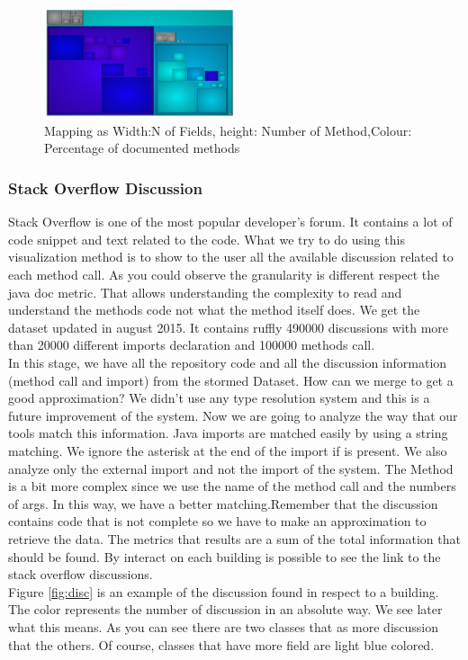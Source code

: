 \documentclass[]{usiinfbachelorproject}
\begin{document}
\begin{figure}[H]
	\centering
	\includegraphics[width=0.5\textwidth]{images/javaDocOnlyPackage}
	
	\caption[Java Documentation Mapping Only Package]{Mapping as Width:N of Fields, height: Number of Method,Colour: Percentage of documented methods\label{fig:OnlyPackage}}
\end{figure}


\subsubsection{Stack Overflow  Discussion}
Stack Overflow is one of the most popular developer's forum. It contains a lot of code snippet and text related to the code. What we try to do using this visualization method is to show to the user all the available discussion related to each method call. As you could observe the granularity is different respect the java doc metric. That allows understanding the complexity to read and understand the methods code not what the method itself does. We get the dataset updated in august 2015. It contains ruffly 490000 discussions with more than 20000 different imports declaration and 100000 methods call.\\
In this stage, we have all the repository code and all the discussion information (method call and import) from the stormed Dataset. How can we merge to get a good approximation? We didn't use any type resolution system and this is a future improvement of the system. Now we are going to analyze the way that our tools match this information. Java imports are matched easily by using a string matching. We ignore the asterisk at the end of the import if is present. We also analyze only the external import and not the import of the system.
The Method is a bit more complex since we use the name of the method call and the numbers of args. In this way, we have a better matching.Remember that the discussion contains code that is not complete so we have to make an approximation to retrieve the data. The metrics that results are a sum of the total information that should be found. By interact on each building is possible to see the link to the stack overflow discussions.\\
Figure \ref{fig:disc} is an example of the discussion found in respect to a building. The color represents the number of discussion in an absolute way. We see later what this means. As you can see there are two classes that as more discussion that the others. Of course, classes that have more field are light blue colored.
\end{document}

